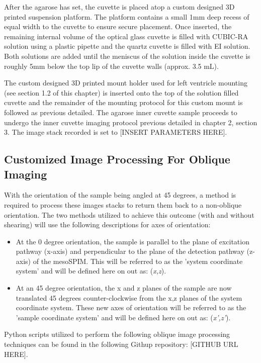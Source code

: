 After the agarose has set, the cuvette is placed atop a custom designed 3D printed suspension platform. The platform contains a small 1mm deep recess of equal width to the cuvette to ensure secure placement. Once inserted, the remaining internal volume of the optical glass cuvette is filled with CUBIC-RA solution using a plastic pipette and the quartz cuvette is filled with EI solution. Both solutions are added until the meniscus of the solution inside the cuvette is roughly 5mm below the top lip of the cuvette walls (approx. 3.5 mL). 

The custom designed 3D printed mount holder used for left ventricle mounting (see section 1.2 of this chapter) is inserted onto the top of the solution filled cuvette and the remainder of the mounting protocol for this custom mount is followed as previous detailed. The agarose inner cuvette sample proceeds to undergo the inner cuvette imaging protocol previous detailed in chapter 2, section 3. The image stack recorded is set to [INSERT PARAMETERS HERE]. 

\subsection{Customized Image Processing For Oblique Imaging}

With the orientation of the sample being angled at 45 degrees, a method is required to process these images stacks to return them back to a non-oblique orientation. The two methods utilized to achieve this outcome (with and without shearing) will use the following descriptions for axes of orientation: 

\begin{itemize}
    \item At the 0 degree orientation, the sample is parallel to the plane of excitation pathway (x-axis) and perpendicular to the plane of the detection pathway (z-axis) of the mesoSPIM. This will be referred to as the 'system coordinate system' and will be defined here on out as: (\textit{x,z}). 
 
 \item At an 45 degree orientation, the x and z planes of the sample are now translated 45 degrees counter-clockwise from the x,z planes of the system coordinate system. These new axes of orientation will be referred to as the 'sample coordinate system' and will be defined here on out as: (\textit{x',z'}).
\end{itemize}

Python scripts utilized to perform the following oblique image processing techniques can be found in the following Githup repository: [GITHUB URL HERE].

